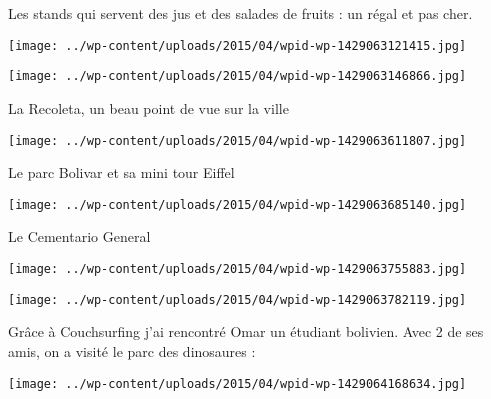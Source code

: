  Les stands qui servent des jus et des salades de fruits : un régal et pas cher. 

 

\begin{center} \texttt{[image: ../wp-content/uploads/2015/04/wpid-wp-1429063121415.jpg]} \end{center}



 

\begin{center} \texttt{[image: ../wp-content/uploads/2015/04/wpid-wp-1429063146866.jpg]} \end{center}



 La Recoleta, un beau point de vue sur la ville

 

\begin{center} \texttt{[image: ../wp-content/uploads/2015/04/wpid-wp-1429063611807.jpg]} \end{center}



 Le parc Bolivar et sa mini tour Eiffel

 

\begin{center} \texttt{[image: ../wp-content/uploads/2015/04/wpid-wp-1429063685140.jpg]} \end{center}



 Le Cementario General

 

\begin{center} \texttt{[image: ../wp-content/uploads/2015/04/wpid-wp-1429063755883.jpg]} \end{center}



 

\begin{center} \texttt{[image: ../wp-content/uploads/2015/04/wpid-wp-1429063782119.jpg]} \end{center}



 Grâce à Couchsurfing j'ai rencontré Omar un étudiant bolivien. Avec 2 de ses amis, on a visité le parc des dinosaures :

 

\begin{center} \texttt{[image: ../wp-content/uploads/2015/04/wpid-wp-1429064168634.jpg]} \end{center}



